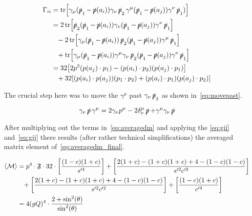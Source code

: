 \begin{equation}
  \label{eq:gij}
  \begin{split}
\Gamma_{ii} &=
\tr[\gamma_\mu(\operatorname{\slashed{p}}_1-\operatorname{\slashed{p}}(a_i))\gamma_\nu\operatorname{\slashed{p}}_2\gamma^\mu(\operatorname{\slashed{p}}_1-\operatorname{\slashed{p}}(a_j))\gamma^\nu\operatorname{\slashed{p}}_1)]\\
&= 2\tr[\operatorname{\slashed{p}}_2(\operatorname{\slashed{p}}_1-\operatorname{\slashed{p}}(a_i))\gamma_v(\operatorname{\slashed{p}}_1-\operatorname{\slashed{p}}(a_j))\gamma^\nu\operatorname{\slashed{p}}_1]\\
&\hphantom{=} - 2\tr[\gamma_\mu(\operatorname{\slashed{p}}_1-\operatorname{\slashed{p}}(a_i))\operatorname{\slashed{p}}_2(\operatorname{\slashed{p}}_1-\operatorname{\slashed{p}}(a_j))\gamma^\mu\operatorname{\slashed{p}}_1]\\
&\hphantom{=} +
\tr[\gamma_\mu(\operatorname{\slashed{p}}_1-\operatorname{\slashed{p}}(a_i))\gamma^\mu\gamma_\nu\operatorname{\slashed{p}}_2(\operatorname{\slashed{p}}_1-\operatorname{\slashed{p}}(a_j))\gamma^\nu\operatorname{\slashed{p}}_1]\\
&= 32 \qty[2p^2(p(a_j)\cdot p_1) - (p(a_i)\cdot p_2)(p(a_j)\cdot p_1)]
   \\
&\hphantom{=} + 32\qty[(p(a_i)\cdot p(a_j))(p_1\cdot p_2) + (p(a_i)\cdot p_1)(p(a_j)\cdot p_2)]
\end{split}
\end{equation}

The crucial step here was to move the \(\gamma^\mu\) past
\(\gamma_\nu\operatorname{\slashed{p}}_2\) as shown in~\eqref{eq:movepast}.

\begin{equation}
  \label{eq:movepast}
  \gamma_\nu\operatorname{\slashed{p}}\gamma^\mu = 2\gamma_\nu p^\mu - 2\delta_\nu^\mu\operatorname{\slashed{p}} +
  \gamma^\mu\gamma_\nu\operatorname{\slashed{p}}
\end{equation}

After multiplying out the terms in~\eqref{eq:averagedm} and applying
the \eqref{eq:gii} and~\eqref{eq:gij} there results (after
rather technical simplifications) the
averaged matrix element of~\eqref{eq:averagedm_final}.

\begin{equation}
  \label{eq:averagedm_final}
  \begin{split}
  \langle\mathcal{M}\rangle &= p^4\cdot\mathfrak{F}\cdot
  32\cdot\qty[\frac{(1-c)(1+c)}{s'^4}] + \qty[\frac{2(1+c) -
    (1+c)(1+c)+4-(1-c)(1-c)}{s'^2c'^2}] \\
  &\hphantom{=} +\qty[\frac{2(1+c) -
    (1+c)(1+c)+4-(1-c)(1-c)}{s'^2c'^2}] +
  \qty[\frac{(1-c)(1+c)}{c'^4}] \\
  &= 4(gQ)^4 \cdot\frac{2+\sin^2(\theta)}{\sin^2(\theta)}
  \end{split}
\end{equation}
